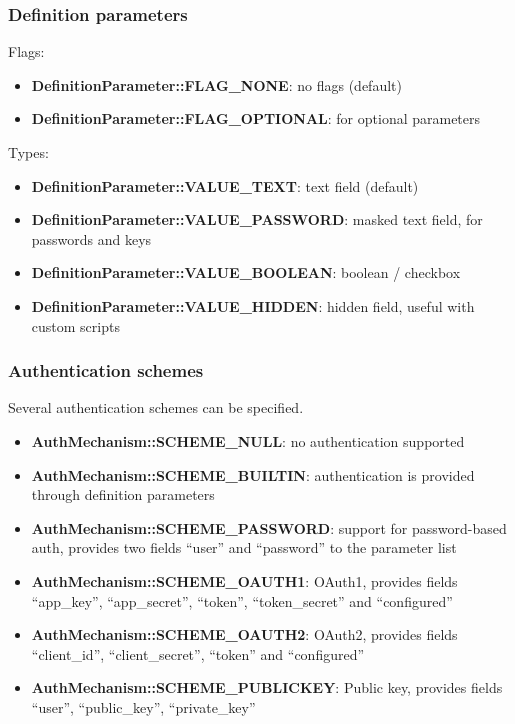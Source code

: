 \documentclass[letterpaper,10pt,english]{sphinxmanual}
\begin{document}
\subsubsection{Definition parameters}
\label{app/extstorage:definition-parameters}
Flags:
\begin{itemize}
\item {} 
\textbf{DefinitionParameter::FLAG\_NONE}: no flags (default)

\item {} 
\textbf{DefinitionParameter::FLAG\_OPTIONAL}: for optional parameters

\end{itemize}

Types:
\begin{itemize}
\item {} 
\textbf{DefinitionParameter::VALUE\_TEXT}: text field (default)

\item {} 
\textbf{DefinitionParameter::VALUE\_PASSWORD}: masked text field, for passwords and keys

\item {} 
\textbf{DefinitionParameter::VALUE\_BOOLEAN}: boolean / checkbox

\item {} 
\textbf{DefinitionParameter::VALUE\_HIDDEN}: hidden field, useful with custom scripts

\end{itemize}


\subsubsection{Authentication schemes}
\label{app/extstorage:authentication-schemes}
Several authentication schemes can be specified.
\begin{itemize}
\item {} 
\textbf{AuthMechanism::SCHEME\_NULL}: no authentication supported

\item {} 
\textbf{AuthMechanism::SCHEME\_BUILTIN}: authentication is provided through definition parameters

\item {} 
\textbf{AuthMechanism::SCHEME\_PASSWORD}: support for password-based auth, provides two fields ``user'' and ``password'' to the parameter list

\item {} 
\textbf{AuthMechanism::SCHEME\_OAUTH1}: OAuth1, provides fields ``app\_key'', ``app\_secret'', ``token'', ``token\_secret'' and ``configured''

\item {} 
\textbf{AuthMechanism::SCHEME\_OAUTH2}: OAuth2, provides fields ``client\_id'', ``client\_secret'', ``token'' and ``configured''

\item {} 
\textbf{AuthMechanism::SCHEME\_PUBLICKEY}: Public key, provides fields ``user'', ``public\_key'', ``private\_key''

\end{itemize}
\end{document}
